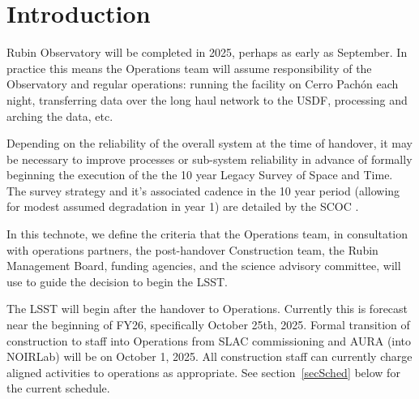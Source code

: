 \section{Introduction}

Rubin Observatory will be completed in 2025, perhaps as early as September. In practice this means the Operations team \cite[see][]{RDO-018} will assume responsibility of the Observatory and regular operations: running the facility on Cerro Pach\'{o}n each night, transferring data over the long haul network to the USDF, processing and arching the data, etc. 

Depending on the reliability of the overall system at the time of handover, it may be necessary to improve processes or sub-system reliability in advance of formally beginning the execution of the the 10 year Legacy Survey of Space and Time. The survey strategy and it's associated cadence in the 10 year period (allowing for modest assumed degradation in year 1) are detailed by the SCOC \cite[]{PSTN-056}. 

In this technote, we define the criteria that the Operations team, in consultation with operations partners, the post-handover Construction team, the Rubin Management Board, funding agencies, and the science advisory committee, will use to guide the decision to begin the LSST. 

The LSST will begin after the handover to Operations. Currently this is forecast near the beginning of FY26, specifically October 25th, 2025. Formal transition of construction to staff into Operations from SLAC commissioning and AURA (into NOIRLab) will be on October 1, 2025. All construction staff can currently charge aligned activities to operations as appropriate. See section~\ref{secSched} below for the current schedule.  

